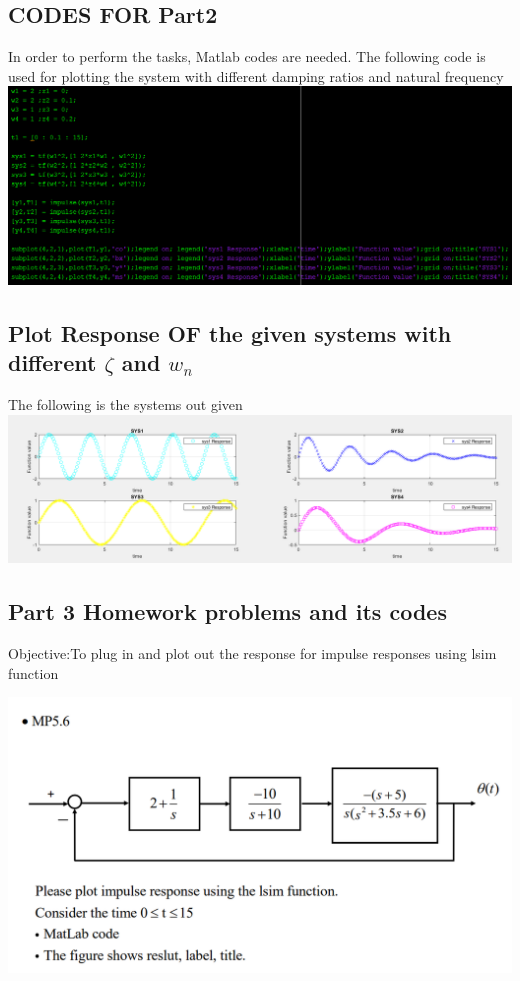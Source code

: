 \documentclass[12pt]{article}
\begin{document}
\subsection{CODES FOR Part2}
In order to perform the tasks, Matlab codes are needed. The following code is used for plotting the system with different damping ratios and natural frequency \\

\includegraphics[scale=0.42]{../Lab9/Pictures/code2.png} 


\subsection{Plot Response OF the given systems with different $\zeta$ and $w_{n}$} 
The following is the systems out given\\

\includegraphics[scale=0.5]{../Lab9/Pictures/output2.png}  \\


\subsection{Part 3 Homework problems and its codes}
Objective:To plug in and plot out the response for impulse responses using lsim function

\includegraphics[scale=0.5]{../Lab9/Pictures/hw3.png} 
\end{document}
